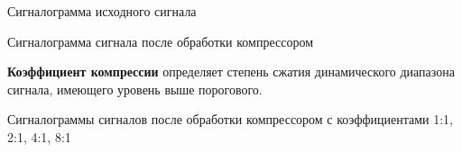 \documentclass{beamer}
\begin{document}
\begin{frame}
  \begin{block}{Сигналограмма исходного сигнала}
  \end{block}

  \begin{block}{Сигналограмма сигнала после обработки компрессором}
  \end{block}
\end{frame}

\begin{frame}
  \textbf{Коэффициент компрессии} определяет степень сжатия динамического диапазона сигнала, имеющего уровень выше порогового.

  \begin{block}{Сигналограммы сигналов после обработки компрессором с коэффициентами 1:1, 2:1, 4:1, 8:1}
  \end{block}
\end{frame}
\end{document}
